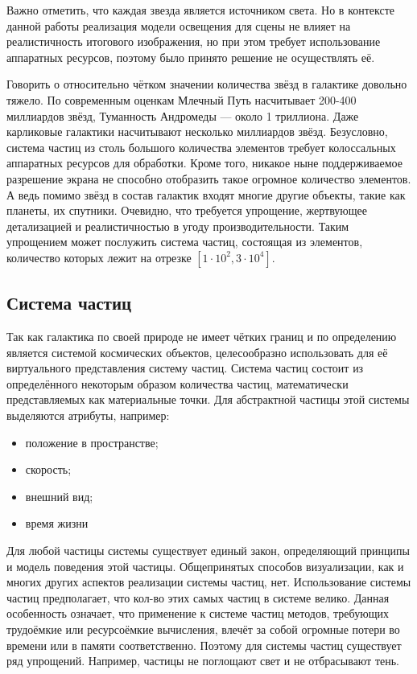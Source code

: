 Важно отметить, что каждая звезда является источником света. Но в контексте данной работы реализация модели освещения для сцены не влияет на реалистичность итогового изображения, но при этом требует использование аппаратных ресурсов, поэтому было принято решение не осуществлять её.

Говорить о относительно чётком значении количества звёзд в галактике довольно тяжело. По современным оценкам Млечный Путь насчитывает 200-400 миллиардов звёзд, Туманность Андромеды — около 1 триллиона. Даже карликовые галактики насчитывают несколько миллиардов звёзд. Безусловно, система частиц из столь большого количества элементов требует колоссальных аппаратных ресурсов для обработки. Кроме того, никакое ныне поддерживаемое разрешение экрана не способно отобразить такое огромное количество элементов. А ведь помимо звёзд в состав галактик входят многие другие объекты, такие как планеты, их спутники. Очевидно, что требуется упрощение, жертвующее детализацией и реалистичностью в угоду производительности. Таким упрощением может послужить система частиц, состоящая из элементов, количество которых лежит на отрезке $[1\cdot{}10^2, 3\cdot{}10^4]$.

\subsection{Система частиц}

Так как галактика по своей природе не имеет чётких границ и по определению является системой космических объектов, целесообразно использовать для её виртуального представления систему частиц. Система частиц состоит из определённого некоторым образом количества частиц, математически представляемых как материальные точки. Для абстрактной частицы этой системы выделяются атрибуты, например:
\begin{itemize}
	\item положение в пространстве;
	\item скорость;
	\item внешний вид;
	\item время жизни
\end{itemize}

Для любой частицы системы существует единый закон, определяющий принципы и модель поведения этой частицы. Общепринятых способов визуализации, как и многих других аспектов реализации системы частиц, нет. Использование системы частиц предполагает, что кол-во этих самых частиц в системе велико. Данная особенность означает, что применение к системе частиц методов, требующих трудоёмкие или ресурсоёмкие вычисления, влечёт за собой огромные потери во времени или в памяти соответственно. Поэтому для системы частиц существует ряд упрощений. Например, частицы не поглощают свет и не отбрасывают тень.

